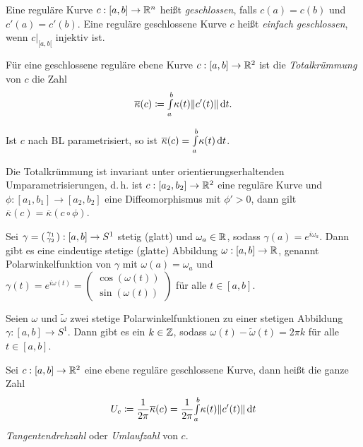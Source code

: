 \documentclass{cheat-sheet}
\newcommand{\Intabdt}[1]{\Int{a}{b}{#1}{t}}
\begin{document}
\begin{defn}
  Eine reguläre Kurve $c : [a, b] \to \mathbb{R}^n$ heißt \emph{geschlossen}, falls $c(a) = c(b)$ und $c'(a) = c'(b)$.
  Eine reguläre geschlossene Kurve $c$ heißt \emph{einfach geschlossen}, wenn $c|_{[a, b[}$ injektiv ist.
\end{defn}

\begin{defn}
  Für eine geschlossene reguläre ebene Kurve $c : [a, b] \to \mathbb{R}^2$ ist die \emph{Totalkrümmung} von $c$ die Zahl
  \[ \overline{\kappa}(c) \coloneqq \Intabdt{\kappa(t) \| c'(t) \|}. \]
\end{defn}

\begin{bem}
  Ist $c$ nach BL parametrisiert, so ist $\overline{\kappa}(c) = \Intabdt{\kappa(t)}$.
\end{bem}

\begin{satz}
  Die Totalkrümmung ist invariant unter orientierungserhaltenden Umparametrisierungen, d.\,h. ist $c : [a_2, b_2] \to \mathbb{R}^2$ eine reguläre Kurve und $\phi : [a_1, b_1] \to [a_2, b_2]$ eine Diffeomorphismus mit $\phi' > 0$, dann gilt $\overline\kappa(c) = \overline\kappa(c \circ \phi)$.
\end{satz}

\begin{satz}
  Sei $\gamma = \begin{psmallmatrix} \gamma_1 \\ \gamma_2 \end{psmallmatrix} : [a, b] \to S^1$ stetig (glatt) und $\omega_a \in \mathbb{R}$, sodass $\gamma(a) = e^{i \omega_a}$. Dann gibt es eine eindeutige stetige (glatte) Abbildung $\omega : [a, b] \to \mathbb{R}$, genannt Polarwinkelfunktion von $\gamma$ mit $\omega(a) = \omega_a$ und $\gamma(t) = e^{i \omega(t)} = \begin{pmatrix} \cos(\omega(t)) \\ \sin(\omega(t)) \end{pmatrix}$ für alle $t \in [a, b]$.
\end{satz}

\begin{satz}
  Seien $\omega$ und $\tilde\omega$ zwei stetige Polarwinkelfunktionen zu einer stetigen Abbildung $\gamma : [a, b] \to S^1$. Dann gibt es ein $k \in \mathbb{Z}$, sodass $\omega(t) - \tilde\omega(t) = 2 \pi k$ für alle $t \in [a, b]$.
\end{satz}

\begin{satz}
  Sei $c : [a, b] \to \mathbb{R}^2$ eine ebene reguläre geschlossene Kurve, dann heißt die ganze Zahl
  \[ U_c \coloneqq \frac{1}{2 \pi} \overline\kappa(c) = \frac{1}{2 \pi} \Intabdt{\kappa(t) \| c'(t) \|} \]
  \emph{Tangentendrehzahl} oder \emph{Umlaufzahl} von $c$.
\end{satz}
\end{document}
